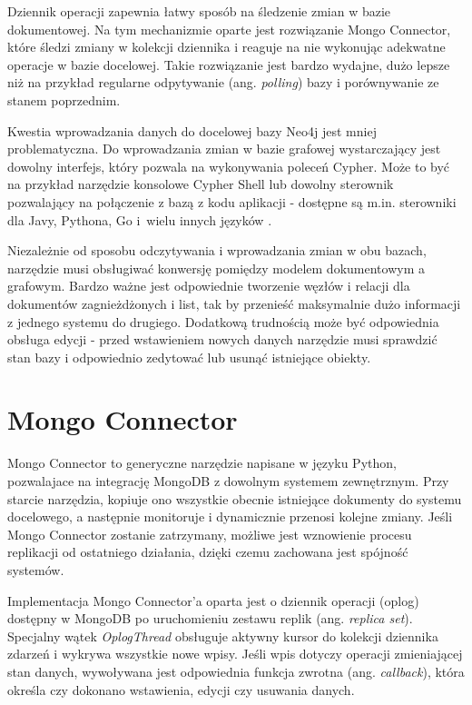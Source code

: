 \documentclass[a4paper,twoside,12pt]{book}
\newcommand{\obcy}[1]{\emph{#1}}
\newcommand{\ang}[1]{{\selectlanguage{british}\obcy{#1}}}
\begin{document}
Dziennik operacji zapewnia łatwy sposób na śledzenie zmian w bazie dokumentowej. Na tym mechanizmie oparte jest rozwiązanie Mongo Connector, które śledzi zmiany w kolekcji dziennika i reaguje na nie wykonując adekwatne operacje w bazie docelowej. Takie rozwiązanie jest bardzo wydajne, dużo lepsze niż na przykład regularne odpytywanie (ang. \ang{polling}) bazy i porównywanie ze stanem poprzednim.

Kwestia wprowadzania danych do docelowej bazy Neo4j jest mniej problematyczna. Do wprowadzania zmian w bazie grafowej wystarczający jest dowolny interfejs, który pozwala na wykonywania poleceń Cypher. Może to być na przykład narzędzie konsolowe Cypher Shell lub dowolny sterownik pozwalający na połączenie z bazą z kodu aplikacji - dostępne są m.in. sterowniki dla Javy, Pythona, Go i~wielu innych języków \cite{bib:neo4j-drivers}.

Niezależnie od sposobu odczytywania i wprowadzania zmian w obu bazach, narzędzie musi obsługiwać konwersję pomiędzy modelem dokumentowym a grafowym. Bardzo ważne jest odpowiednie tworzenie węzłów i relacji dla dokumentów zagnieżdżonych i list, tak by przenieść maksymalnie dużo informacji z jednego systemu do drugiego. Dodatkową trudnością może być odpowiednia obsługa edycji - przed wstawieniem nowych danych narzędzie musi sprawdzić stan bazy i odpowiednio zedytować lub usunąć istniejące obiekty.  

\section{Mongo Connector}

Mongo Connector \cite{bib:mongo-connector-github, bib:mongo-connector-introducing} to generyczne narzędzie napisane w języku Python, pozwalajace na integrację MongoDB z dowolnym systemem zewnętrznym. Przy starcie narzędzia, kopiuje ono wszystkie obecnie istniejące dokumenty do systemu docelowego, a następnie monitoruje i dynamicznie przenosi kolejne zmiany. Jeśli Mongo Connector zostanie zatrzymany, możliwe jest wznowienie procesu replikacji od ostatniego działania, dzięki czemu zachowana jest spójność systemów.

Implementacja Mongo Connector'a oparta jest o dziennik operacji (oplog) dostępny w MongoDB po uruchomieniu zestawu replik (ang. \ang{replica set}). Specjalny wątek \textit{OplogThread} obsługuje aktywny kursor do kolekcji dziennika zdarzeń i wykrywa wszystkie nowe wpisy. Jeśli wpis dotyczy operacji zmieniającej stan danych, wywoływana jest odpowiednia funkcja zwrotna (ang. \ang{callback}), która określa czy dokonano wstawienia, edycji czy usuwania danych.
\end{document}
